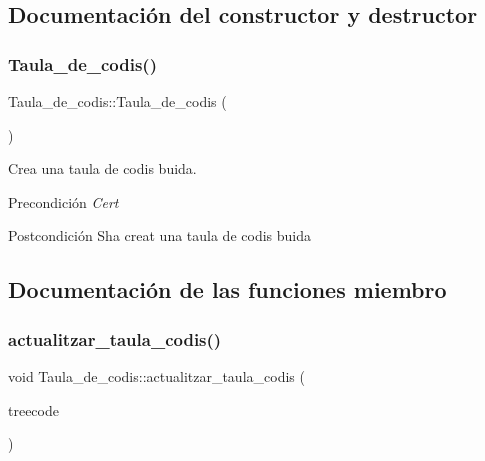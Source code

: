 \subsection{Documentación del constructor y destructor}
\mbox{\label{class_taula__de__codis_a68461878363b3b3e084215085cc264e5}} 
\subsubsection{\texorpdfstring{Taula\+\_\+de\+\_\+codis()}{Taula\_de\_codis()}}
{\footnotesize\ttfamily Taula\+\_\+de\+\_\+codis\+::\+Taula\+\_\+de\+\_\+codis (\begin{DoxyParamCaption}{ }\end{DoxyParamCaption})}



Crea una taula de codis buida. 

\begin{DoxyPrecond}{Precondición}
{\itshape Cert} 
\end{DoxyPrecond}
\begin{DoxyPostcond}{Postcondición}
S\textquotesingle{}ha creat una taula de codis buida 
\end{DoxyPostcond}


\subsection{Documentación de las funciones miembro}
\mbox{\label{class_taula__de__codis_a290a2b377c70c88326dfa0d8b10b0c57}} 
\subsubsection{\texorpdfstring{actualitzar\+\_\+taula\+\_\+codis()}{actualitzar\_taula\_codis()}}
{\footnotesize\ttfamily void Taula\+\_\+de\+\_\+codis\+::actualitzar\+\_\+taula\+\_\+codis (\begin{DoxyParamCaption}\item[{Bin\+Tree$<$ pair$<$ string, int $>$ $>$ \&}]{treecode }\end{DoxyParamCaption})}



